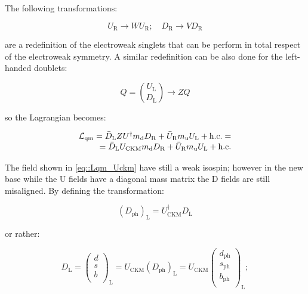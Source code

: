 The following transformations:

\begin{equation}
U_{\text{R}} \longrightarrow W U_{\text{R}}; \quad D_{\text{R}} \longrightarrow V D_{\text{R}}
\end{equation}

are a redefinition of the electroweak singlets that can be perform in total respect of the electroweak symmetry. A similar redefinition can be also done for the left-handed doublets:

\begin{equation}
Q = \binom{U_{\text{L}}}{D_{\text{L}}} \longrightarrow ZQ
\end{equation}

so the Lagrangian becomes:

\begin{equation}
\begin{array}{r c l}
\mathcal{L}_{\text{qm}} = \bar{D}_{\text{L}}ZU^{\dagger}m_{\text{d}}D_{\text{R}} + \bar{U}_{\text{R}}m_{\text{u}}U_{\text{L}} + \text{h.c.} = \\
= \bar{D}_{\text{L}}U_{\text{CKM}}m_{\text{d}}D_{\text{R}} + \bar{U}_{\text{R}}m_{\text{u}}U_{\text{L}} + \text{h.c.}
\label{eq::Lqm_Uckm}
\end{array}
\end{equation}

The field shown in \autoref{eq::Lqm_Uckm} have still a weak isospin; however in the new base while the U fields have a diagonal mass matrix the D fields are still misaligned. By defining the transformation:

\begin{equation}
\left(D_{\text{ph}}\right)_{\text{L}} = U^{\dagger}_{\text{CKM}}D_{\text{L}}
\end{equation}

or rather:

\begin{equation}
D_{\text{L}} = 
\begin{pmatrix}
d  \\
s  \\
b \\
\end{pmatrix}
_{\text{L}} =
U_{\text{CKM}}\left(D_{\text{ph}}\right)_{\text{L}} = U_{\text{CKM}}
\begin{pmatrix}
d_{\text{ph}}  \\
s_{\text{ph}}  \\
b_{\text{ph}} \\
\end{pmatrix}
_{\text{L}} ;
\end{equation}

